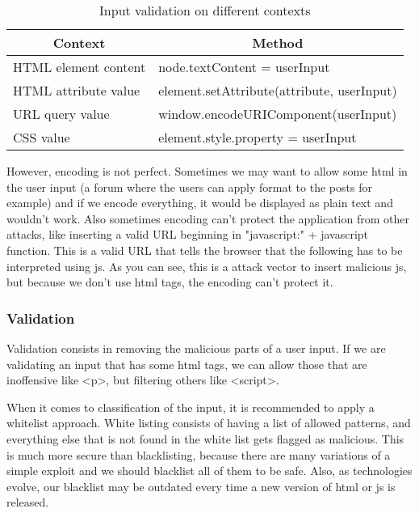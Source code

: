 \begin{table}[]
	\centering
	\caption{Input validation on different contexts}
	\label{my-label}
	\begin{tabular}{|l|l|}
		\hline
		\multicolumn{1}{|c|}{\textbf{Context}} & \multicolumn{1}{c|}{\textbf{Method}}                           \\ \hline
		HTML element content                   & node.textContent = userInput 									\\ \hline
		HTML attribute value                   & element.setAttribute(attribute, userInput)                   	\\ \hline
		URL query value                        & window.encodeURIComponent(userInput)                           \\ \hline
		CSS value                              & element.style.property = userInput                             \\ \hline
	\end{tabular}
\end{table}

However, encoding is not perfect. Sometimes we may want to allow some html in the user input (a forum where the users can apply format to the posts for example) and if we encode everything, it would be displayed as plain text and wouldn't work. Also sometimes encoding can't protect the application from other attacks, like inserting a valid URL beginning in "javascript:" + javascript function. This is a valid URL that tells the browser that the following has to be interpreted using js. As you can see, this is a attack vector to insert malicious js, but because we don't use html tags, the encoding can't protect it.

\subsubsection{Validation}
Validation consists in removing the malicious parts of a user input. If we are validating an input that has some html tags, we can allow those that are inoffensive like <p>, but filtering others like <script>.

When it comes to classification of the input, it is recommended to apply a whitelist approach. White listing consists of having a list of allowed patterns, and everything else that is not found in the white list gets flagged as malicious. This is much more secure than blacklisting, because there are many variations of a simple exploit and we should blacklist all of them to be safe. Also, as technologies evolve, our blacklist may be outdated every time a new version of html or js is released. 


